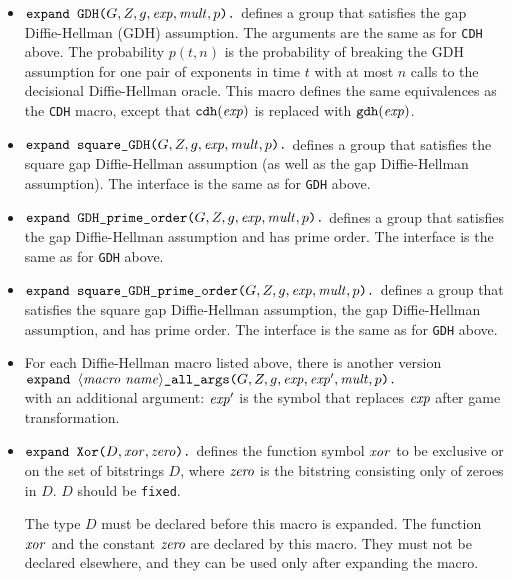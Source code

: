 \documentclass{article}
\begin{document}
\begin{itemize}
\item $\texttt{expand\ GDH(}G, Z, g, \mathit{exp}, \mathit{mult},
  p\texttt{).}$ defines a group that satisfies the gap
  Diffie-Hellman (GDH) assumption. The arguments are the same as for
  \texttt{CDH} above. The probability $p(t,n)$ is the probability of breaking
  the GDH assumption for one pair of exponents in time $t$ with at most $n$ calls to the decisional Diffie-Hellman oracle. This macro defines the same equivalences
as the \texttt{CDH} macro, except that $\texttt{cdh}(\mathit{exp})$ is replaced
with $\texttt{gdh}(\mathit{exp})$.

\item
  $\texttt{expand\ square\_GDH(}G, Z, g, \mathit{exp}, \mathit{mult},
  p\texttt{).}$
  defines a group that satisfies the square gap Diffie-Hellman
  assumption (as well as the gap Diffie-Hellman assumption). The
  interface is the same as for \texttt{GDH} above.

\item $\texttt{expand\ GDH\_prime\_order(}G, Z, g, \mathit{exp}, \mathit{mult},
  p\texttt{).}$ defines a group that satisfies the gap
  Diffie-Hellman assumption and has prime order. The interface is 
  the same as for \texttt{GDH} above.

\item
  $\texttt{expand\ square\_GDH\_prime\_order(}G, Z, g, \vn{exp},
  \vn{mult}, p\texttt{).}$
  defines a group that satisfies the square gap Diffie-Hellman
  assumption, the gap Diffie-Hellman assumption, and has prime
  order. The interface is the same as for \texttt{GDH} above.

\item For each Diffie-Hellman macro listed above, there is another version\\
$\texttt{expand\ }\langle\mathit{macro\ name}\rangle\texttt{\_all\_args(}G, Z, g, \vn{exp}, \vn{exp}',
  \vn{mult}, p\texttt{).}$\\
 with an additional argument: $\mathit{exp}'$ is the
  symbol that replaces $\mathit{exp}$ after game transformation.

\item $\texttt{expand\ Xor(}D, \mathit{xor}, \mathit{zero}\texttt{).}$ defines the
  function symbol $\mathit{xor}$ to be exclusive or on the set of
  bitstrings $D$, where $\mathit{zero}$ is the bitstring consisting only
  of zeroes in $D$. $D$ should be \texttt{fixed}.

  The type $D$ must be declared before this macro is expanded. The
  function $\mathit{xor}$ and the constant $\mathit{zero}$ are declared by
  this macro.  They must not be declared elsewhere, and they can be
  used only after expanding the macro.


\end{itemize}
\end{document}
